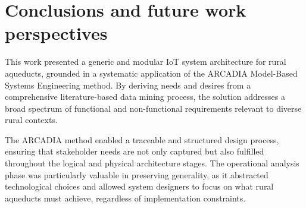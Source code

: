 \documentclass[conference]{IEEEtran}
\begin{document}

\section{Conclusions and future work perspectives}
This work presented a generic and modular IoT system architecture for rural aqueducts, grounded in a systematic application of the ARCADIA Model-Based Systems Engineering method. By deriving needs and desires from a comprehensive literature-based data mining process, the solution addresses a broad spectrum of functional and non-functional requirements relevant to diverse rural contexts.

The ARCADIA method enabled a traceable and structured design process, ensuring that stakeholder needs are not only captured but also fulfilled throughout the logical and physical architecture stages. The operational analysis phase was particularly valuable in preserving generality, as it abstracted technological choices and allowed system designers to focus on what rural aqueducts must achieve, regardless of implementation constraints.
\end{document}
